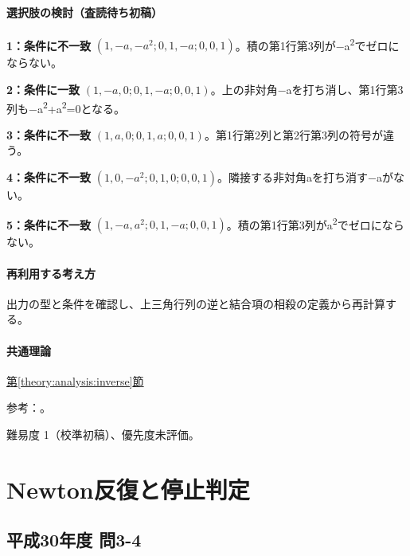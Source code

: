 \paragraph{選択肢の検討（査読待ち初稿）}\mbox{}\par

\noindent\textbf{1：条件に不一致} \((1,-a,-a^2;0,1,-a;0,0,1)\)。積の第1行第3列が−a\textsuperscript{2}でゼロにならない。\par

\noindent\textbf{2：条件に一致} \((1,-a,0;0,1,-a;0,0,1)\)。上の非対角−aを打ち消し、第1行第3列も−a\textsuperscript{2}+a\textsuperscript{2}=0となる。\par

\noindent\textbf{3：条件に不一致} \((1,a,0;0,1,a;0,0,1)\)。第1行第2列と第2行第3列の符号が違う。\par

\noindent\textbf{4：条件に不一致} \((1,0,-a^2;0,1,0;0,0,1)\)。隣接する非対角aを打ち消す−aがない。\par

\noindent\textbf{5：条件に不一致} \((1,-a,a^2;0,1,-a;0,0,1)\)。積の第1行第3列がa\textsuperscript{2}でゼロにならない。\par

\paragraph{再利用する考え方} 出力の型と条件を確認し、上三角行列の逆と結合項の相殺の定義から再計算する。

\paragraph{共通理論} \hyperref[theory:analysis:inverse]{第\ref*{theory:analysis:inverse}節}

\par 参考：\cite{mit_inverse2007}。

\par 難易度 1（校準初稿）、優先度未評価。

\section{Newton反復と停止判定}

\subsection{平成30年度 問3-4}
\label{q:h30-reg-basic-3-4}

